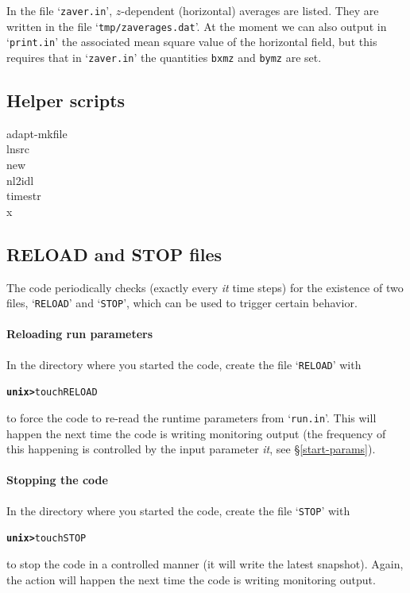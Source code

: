 \documentclass[12pt,twoside,notitlepage,a4paper]{article}
\makeatletter
\newcommand{\prompt}[1]{{\ttfamily\bfseries{}#1}}
\newcommand{\code}[1]{\texttt{#1}}
\newcommand{\var}[1]{\textsl{#1}\index{#1@\emph{#1}}\/}
\newcommand{\file}[1]{`\texttt{#1}'}
\makeatother
\begin{document}
In the file \file{zaver.in}, $z$-dependent (horizontal) averages are listed.
They are written in the file \file{tmp/zaverages.dat}. At the moment we
can also output in \file{print.in} the associated mean square value
of the horizontal field, but this requires that in \file{zaver.in} the
quantities \code{bxmz} and \code{bymz} are set.


\subsection{Helper scripts}

\begin{description}
  \item[adapt-mkfile]
  \item[lnsrc]
  \item[new]
  \item[nl2idl]
  \item[timestr]
  \item[x]
\end{description}

\vspace{5cm}


\subsection{RELOAD and STOP files}

The code periodically checks (exactly every \var{it} time steps)
for the existence of two files, \file{RELOAD}
and \file{STOP}, which can be used to trigger certain behavior.

\paragraph{Reloading run parameters}
In the directory where you started the code, create the file
\file{RELOAD} with
\begin{alltt}
  \prompt{unix> } touch RELOAD \
\end{alltt}
to force the code to re-read the runtime parameters from \file{run.in}.
This will happen the next time the code is writing monitoring output (the
frequency of this happening is controlled by the input parameter \var{it},
see \S\ref{start-params}).

\paragraph{Stopping the code}
In the directory where you started the code, create the file
\file{STOP} with
\begin{alltt}
  \prompt{unix> } touch STOP \
\end{alltt}
to stop the code in a controlled manner (it will write the latest
snapshot).
Again, the action will happen the next time the code is writing monitoring
output.
\end{document}
